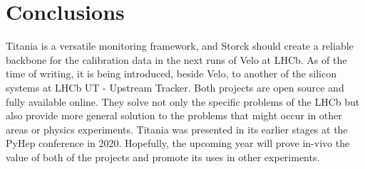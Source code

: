 \section{Conclusions}

Titania is a versatile monitoring framework, and Storck should create a reliable backbone for the calibration data in the next runs of Velo at LHCb.
As of the time of writing, it is being introduced, beside Velo, to another of the silicon systems at LHCb UT - Upstream Tracker.
Both projects are open source and fully available online.
They solve not only the specific problems of the LHCb but also provide more general solution to the problems that might occur in other areas or physics experiments.
Titania was presented in its earlier stages at the PyHep conference in 2020.
Hopefully, the upcoming year will prove in-vivo the value of both of the projects and promote its uses in other experiments.

